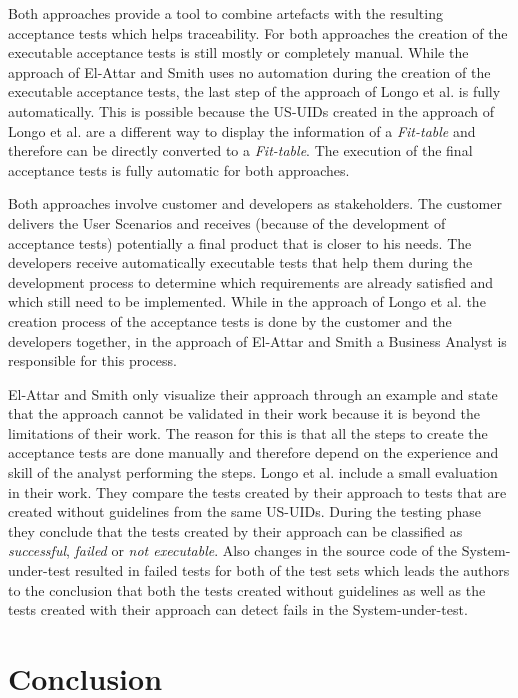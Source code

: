 Both approaches provide a tool to combine artefacts with the resulting acceptance tests which helps traceability.
For both approaches the creation of the executable acceptance tests is still mostly or completely manual.
While the approach of El-Attar and Smith uses no automation during the creation of the executable acceptance tests, the last step of the approach of Longo et al. is fully automatically.
This is possible because the US-UIDs created in the approach of Longo et al. are a different way to display the information of a \textit{Fit-table} and therefore can be directly converted to a \textit{Fit-table}.
The execution of the final acceptance tests is fully automatic for both approaches.

Both approaches involve customer and developers as stakeholders.
The customer delivers the User Scenarios and receives (because of the development of acceptance tests) potentially a final product that is closer to his needs.
The developers receive automatically executable tests that help them during the development process to determine which requirements are already satisfied and which still need to be implemented.
While in the approach of Longo et al. the creation process of the acceptance tests is done by the customer and the developers together, in the approach of El-Attar and Smith a Business Analyst is responsible for this process.

El-Attar and Smith only visualize their approach through an example and state that the approach cannot be validated in their work because it is beyond the limitations of their work.
The reason for this is that all the steps to create the acceptance tests are done manually and therefore depend on the experience and skill of the analyst performing the steps.
Longo et al. include a small evaluation in their work.
They compare the tests created by their approach to tests that are created without guidelines from the same US-UIDs.
During the testing phase they conclude that the tests created by their approach can be classified as \textit{successful}, \textit{failed} or \textit{not executable}.
Also changes in the source code of the System-under-test resulted in failed tests for both of the test sets which leads the authors to the conclusion that both the tests created without guidelines as well as the tests created with their approach can detect fails in the System-under-test.


\section{Conclusion}
\label{sec:conclusion}

